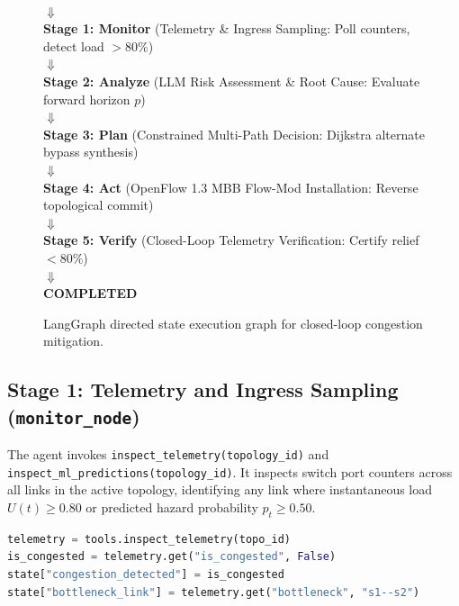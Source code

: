 \begin{figure}[H]
  \centering
  \begin{tcolorbox}[colback=codebg,colframe=sdnnavy,arc=2pt,title=\textbf{LangGraph 5-Stage Autonomous Execution Graph}]
  \centering
  \small\ttfamily
  [START]\\
  $\Downarrow$\\
  \textbf{Stage 1: Monitor} (Telemetry \& Ingress Sampling: Poll counters, detect load $>80\%$)\\
  $\Downarrow$\\
  \textbf{Stage 2: Analyze} (LLM Risk Assessment \& Root Cause: Evaluate forward horizon $p$)\\
  $\Downarrow$\\
  \textbf{Stage 3: Plan} (Constrained Multi-Path Decision: Dijkstra alternate bypass synthesis)\\
  $\Downarrow$\\
  \textbf{Stage 4: Act} (OpenFlow 1.3 MBB Flow-Mod Installation: Reverse topological commit)\\
  $\Downarrow$\\
  \textbf{Stage 5: Verify} (Closed-Loop Telemetry Verification: Certify relief $<80\%$)\\
  $\Downarrow$\\[0.2em]
  \textbf{COMPLETED}
  \end{tcolorbox}
  \caption{LangGraph directed state execution graph for closed-loop congestion mitigation.}
  \label{fig:agent_langgraph_pipeline}
\end{figure}

\subsection{Stage 1: Telemetry and Ingress Sampling (\texttt{monitor\_node})}
The agent invokes \texttt{inspect\_telemetry(topology\_id)} and \texttt{inspect\_ml\_predictions(topology\_id)}. It inspects switch port counters across all links in the active topology, identifying any link where instantaneous load $U(t) \ge 0.80$ or predicted hazard probability $p_t \ge 0.50$.
\begin{lstlisting}[language=Python]
telemetry = tools.inspect_telemetry(topo_id)
is_congested = telemetry.get("is_congested", False)
state["congestion_detected"] = is_congested
state["bottleneck_link"] = telemetry.get("bottleneck", "s1--s2")
\end{lstlisting}

